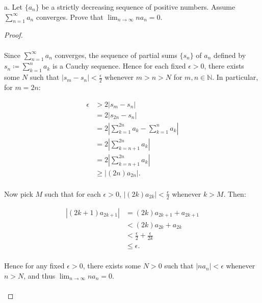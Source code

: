 a.  Let $\{a_n\}$ be a strictly decreasing sequence of positive numbers. Assume
    $\sum\limits_{n=1}^{\infty}{a_n}$ converges. Prove that
    $\lim_{n \rightarrow \infty}{na_n} = 0$.

    \begin{proof}\ \\\\
        Since $\sum\limits_{n=1}^{\infty}{a_n}$ converges, the sequence of
        partial sums $\{s_n\}$ of $a_n$ defined by
        $s_n \coloneqq \sum\limits_{k=1}^n{a_k}$ is a Cauchy sequence. Hence
        for each fixed $\epsilon > 0$, there exists some $N$ such that
        $|s_m - s_n| < \frac{\epsilon}{2}$ whenever
        $m > n > N$ for $m,n \in \mathbb{N}$.  In particular, for $m = 2n$:
    
        \begin{align*}
            \epsilon &> 2|s_m - s_n| \\
                     &= 2|s_{2n} - s_n| \\
                     &= 2\left|\sum\limits_{k=1}^{2n}{a_k} - \sum\limits_{k=1}^n{a_k}\right| \\
                     &= 2\left|\sum\limits_{k=n+1}^{2n}{a_k}\right| \\
                     &= 2\left|\sum\limits_{k=n+1}^{2n}{a_k}\right| \\
                     &\ge |(2n)a_{2n}|. \\
        \end{align*}

        Now pick $M$ such that for each $\epsilon > 0$,
        $|(2k)a_{2k}| < \frac{\epsilon}{2}$ whenever $k > M$. Then:

        \begin{align*}
            |(2k+1)a_{2k+1}| &= (2k)a_{2k+1} + a_{2k+1} \\
                             &< (2k)a_{2k} + a_{2k} \\
                             &< \frac{\epsilon}{2} + \frac{\epsilon}{2k} \\
                             &\le \epsilon. \\
        \end{align*}

        Hence for any fixed $\epsilon > 0$, there exists some $N > 0$ such that
        $|na_n| < \epsilon$ whenever $n > N$, and thus
        $\lim_{n \rightarrow \infty}{na_n} = 0$.
        \\\\
    \end{proof}
    \pagebreak

